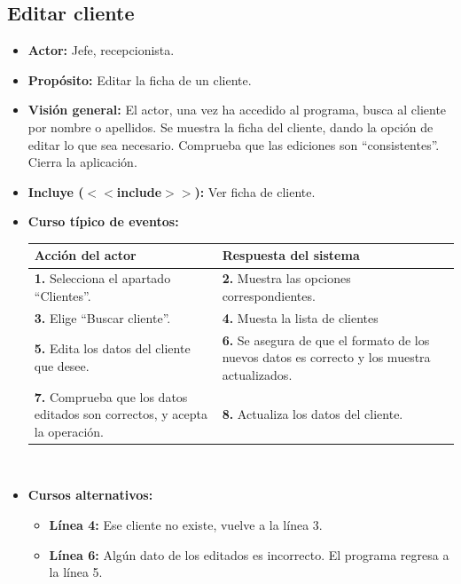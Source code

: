 \documentclass[spanish,a4paper,11pt, twoside]{report}	%
\begin{document}
	\subsection{Editar cliente}		
			\begin{itemize}
			\item \textbf{Actor:} Jefe, recepcionista.
			\item \textbf{Propósito:} Editar la ficha de un cliente.
			\item \textbf{Visión general:} El actor, una vez ha accedido al programa, 
				busca al cliente por nombre o apellidos. Se muestra
				la ficha del cliente, dando la opción de editar lo que sea necesario. Comprueba
				que las ediciones son ``consistentes''. Cierra la aplicación.
			\item \textbf{Incluye ($<<$include$>>$):} Ver ficha de cliente.
			\item \textbf{Curso típico de eventos:} 	\\
				\begin{tabular}{|p{6cm}||p{6cm}|}
				\hline
				\textbf{Acción del actor} & \textbf{Respuesta del sistema} \\ \hline \hline
				\textbf{1.} Selecciona el apartado ``Clientes''. & 
				\textbf{2.} Muestra las opciones correspondientes. \\ \hline
				\textbf{3.} Elige  ``Buscar cliente''.	& 
				\textbf{4.} Muesta la lista de clientes \\ \hline
				\textbf{5.} Edita los datos del cliente que desee. & 
				\textbf{6.} Se asegura de que el formato de los nuevos datos es correcto y
					los muestra actualizados.\\ \hline
				\textbf{7.} Comprueba que los datos editados son correctos, y acepta la operación. & 
				\textbf{8.} Actualiza los datos del cliente. \\ \hline
				\end{tabular}
			\\
			\item \textbf{Cursos alternativos:} 
			\begin{itemize}
				\item  \textbf{Línea 4:} Ese cliente no existe, vuelve a la línea 3.
				\item  \textbf{Línea 6:} Algún dato de los editados es incorrecto. El programa regresa a la línea 5.
			\end {itemize}
		\end{itemize}


\end{document}
